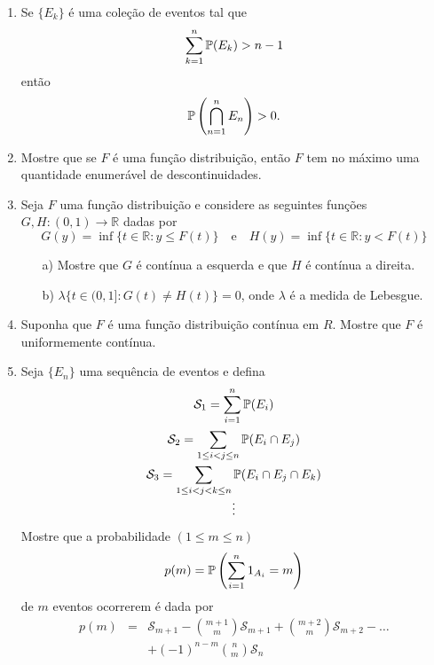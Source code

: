 \begin{enumerate}[leftmargin=*]
\item 
Se $\{E_k\}$ é uma coleção de eventos tal que 
	\[
		\sum_{k=1}^{n} \P(E_k) > n-1
	\]
então 
\[	
	\P\left(  \bigcap_{n=1}^{n} E_n\right) >0. 
\]	






\item 
Mostre que se $F$ é uma função distribuição, 
então $F$ tem no máximo uma quantidade enumerável 
de descontinuidades.






\item 
Seja $F$ uma função distribuição e considere as seguintes
funções $G,H:(0,1)\to \mathbb{R}$ dadas por 
	\[
		G(y)= \inf\{t\in\mathbb{R}: y\leq F(t) \}
		\quad
		\text{e}
		\quad
		H(y)= \inf\{t\in\mathbb{R}: y < F(t) \}
	\]
	\begin{itemize}
		\item[a)	]
		Mostre que $G$ é contínua a esquerda e que $H$
		é contínua a direita.  

		\item[b)] 
		$\lambda \{t\in (0,1]: G(t)\neq H(t) \} =0$, 
		onde $\lambda$ é a medida de Lebesgue. 
	\end{itemize}







\item 
Suponha que $F$ é uma função distribuição contínua 
em $R$. Mostre que $F$ é uniformemente contínua.




\item 
Seja $\{E_n\}$ uma sequência de eventos e defina
\[
\begin{array}{c}
	\displaystyle \mathcal{S}_{1} 
	= \sum_{i=1}^{n} \P(E_i) 
	\\[0.5cm]
	\displaystyle \mathcal{S}_{2} 
	= \sum_{1\leq i<j\leq n} \P(E_i\cap E_j) 
	\\[0.5cm]
	\displaystyle\mathcal{S}_{3} 
	= \sum_{1\leq i<j<k\leq n} \P(E_i\cap E_j\cap E_k ) 
	\\[0.3cm]
	\vdots
\end{array}
\]
	Mostre que a probabilidade $(1\leq m\leq n)$
		\[
			p(m) = \P\left( \sum_{i=1}^n 1_{A_i} = m \right)
		\]
	de $m$ eventos ocorrerem é dada por 
		\[
			\begin{array}{rcl}
			p(m) 
			&=&\displaystyle
			\mathcal{S}_{m+1} 
			- 
			\binom{m+1}{m}\mathcal{S}_{m+1}
			+
			\binom{m+2}{m}\mathcal{S}_{m+2}
			-
			\ldots
			\\[0.7cm]
			&&\displaystyle
			+ (-1)^{n-m} \binom{n}{m}\mathcal{S}_{n}			
			\end{array}
		\]







\end{enumerate}
